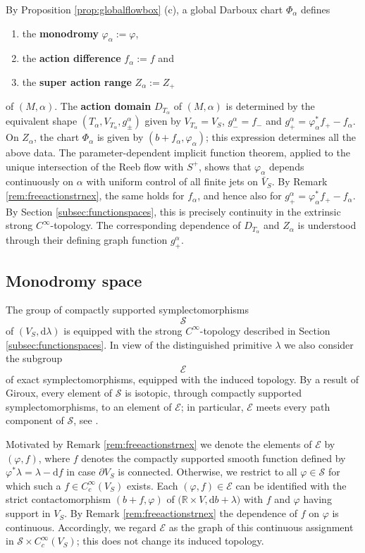 \documentclass{amsart}
\theoremstyle{definition}
\newcommand{\rmd}{\mathrm d}
\newcommand{\EE}{\mathcal E}
\newcommand{\R}{\mathbb R}
\renewcommand{\SS}{\mathcal S}
\begin{document}
 By Proposition \ref{prop:globalflowbox} (c),
 a global Darboux chart $\Phi_{\alpha}$ defines
 	\begin{enumerate}
	 \item the {\bf monodromy} $\varphi_{\alpha}:=\varphi$,
	 \item the {\bf action difference} $f_{\alpha}:=f$ and
	 \item the {\bf super action range} $Z_{\alpha}:=Z_+$
 	\end{enumerate}
 of $(M,\alpha)$.
 The {\bf action domain} $D_{T_{\alpha}}\!$ of $(M,\alpha)$
 is determined by the equivalent shape
 $(T_{\alpha},V_{T_{\alpha}},g_{\pm}^{\alpha})$
 given by $V_{T_{\alpha}}\!=V_S$, $g_-^{\alpha}=f_-$ and
 $g_+^{\alpha}=\varphi_{\alpha}^*f_+-f_{\alpha}$.
On $Z_{\alpha}$,
the chart $\Phi_{\alpha}$ is given by
$(b+f_{\alpha},\varphi_{\alpha})$;
this expression determines all the above data.
The parameter-dependent implicit function theorem,
applied to the unique intersection of the Reeb flow
with $S^+$,
shows that $\varphi_{\alpha}$ depends continuously
on $\alpha$ with uniform control of all finite jets
on $\bar{V}_S$.
By Remark \ref{rem:freeactionstrnex},
the same holds for $f_{\alpha}$,
and hence also for
$g_+^{\alpha}=\varphi_{\alpha}^*f_+-f_{\alpha}$.
By Section \ref{subsec:functionspaces},
this is precisely continuity
in the extrinsic strong $C^{\infty}$-topology.
The corresponding dependence of
$D_{T_{\alpha}}$ and $Z_{\alpha}$
is understood through their defining graph function
$g_+^{\alpha}$.



\subsection{Monodromy space}
\label{subsec:monodromyspace}

The group
of compactly supported symplectomorphisms
\[\SS\]
of $(V_S,\rmd\lambda)$
is equipped with the strong $C^{\infty}$-topology
described in Section \ref{subsec:functionspaces}.
In view of the distinguished primitive $\lambda$
we also consider the subgroup
\[\EE\]
of exact symplectomorphisms,
equipped with the induced topology.
By a result of Giroux,
every element of $\SS$
is isotopic, through compactly supported symplectomorphisms,
to an element of $\EE$; in particular, $\EE$ meets every
path component of $\SS$,
see \cite[Lemma~7.3.4]{gei08}.

Motivated by Remark \ref{rem:freeactionstrnex}
we denote the elements of $\EE$ by $(\varphi,f)$,
where $f$ denotes the compactly supported
smooth function defined by
$\varphi^*\lambda=\lambda-\rmd f$
in case $\partial V_S$ is connected.
Otherwise,
we restrict to all $\varphi\in\SS$
for which such a $f\in C_c^{\infty}(V_S)$ exists.
Each $(\varphi,f)\in\EE$ can be identified with the
strict contactomorphism $(b+f,\varphi)$
of $\big(\R\times V,\rmd b+\lambda\big)$
with $f$ and $\varphi$ having support in $V_S$.
By Remark \ref{rem:freeactionstrnex}
the dependence of $f$ on $\varphi$ is continuous.
Accordingly, we regard $\EE$ as the graph
of this continuous assignment in
$\SS\times C_c^{\infty}(V_S)$;
this does not change its induced topology.
\end{document}
